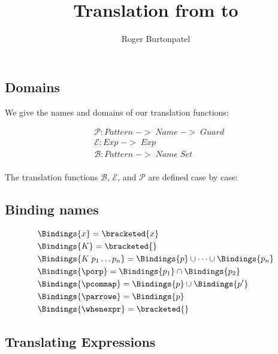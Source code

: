 \documentclass[]{article}
\title{Translation from {\PPlus} to {\VMinus}}
\author{Roger Burtonpatel}
\begin{document}
\maketitle

\subsection{Domains}
We give the names and domains of our translation functions: 

\begin{align*}
    &\mathcal{P}: Pattern\; ->\; Name\; ->\; Guard \\
    &\mathcal{E}: Exp\; ->\; Exp \\
    &\mathcal{B}: Pattern\; ->\; Name\; Set \\
    \end{align*}

The translation functions $\mathcal{B}$, $\mathcal{E}$, and $\mathcal{P}$
are defined case by case: 

\subsection{Binding names}

\begin{align*}
    &\Bindings{x} = \bracketed{x} \\ 
    &\Bindings{K} = \bracketed{} \\
    &\Bindings{K\; p_{1} \dots p_{n}} = \Bindings{p} \cup \dots \cup \Bindings{p_{n}} \\
    &\Bindings{\porp} = \Bindings{p_{1}} \cap \Bindings{p_{2}} \\
    &\Bindings{\pcommap} = \Bindings{p} \cup \Bindings{p'} \\
    &\Bindings{\parrowe} = \Bindings{p} \\
    &\Bindings{\whenexpr} = \bracketed{}
\end{align*}

\subsection{Translating Expressions}
\end{document}
